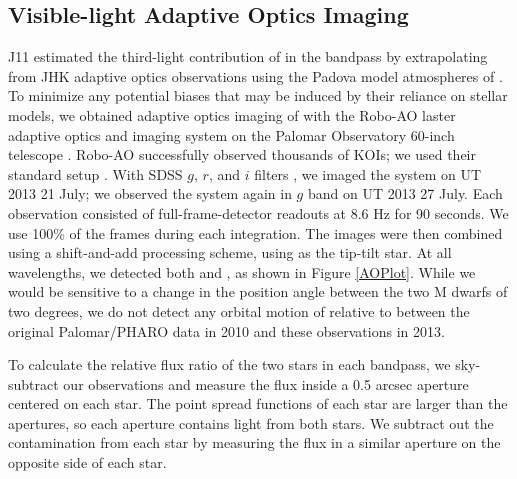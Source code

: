 \subsection{Visible-light Adaptive Optics Imaging}

J11 estimated the third-light contribution of \LB{} in the \itk{} bandpass by extrapolating from JHK adaptive optics observations using the Padova model atmospheres of \citet{Girardi02}. 
To minimize any potential biases that may be induced by their reliance on stellar models, we obtained adaptive optics imaging of \LHS{} with the Robo-AO laster adaptive optics and imaging system on the Palomar Observatory 60-inch telescope \citep{Baranec14}. 
Robo-AO successfully observed thousands of KOIs; we used their standard setup \citep{Law14}. 
With SDSS $g$, $r$, and $i$ filters \citep{York00}, we imaged the system on UT 2013 21 July; we observed the system again in $g$ band on UT 2013 27 July. 
Each observation consisted of full-frame-detector readouts at 8.6 Hz for 90 seconds. 
We use 100\% of the frames during each integration.
The images were then combined using a shift-and-add processing scheme, using \LA{} as the tip-tilt star. 
At all wavelengths, we detected both \LA{} and \LB, as shown in Figure \ref{AOPlot}.
While we would be sensitive to a change in the position angle between the two M dwarfs of two degrees, we do not detect any orbital motion of \LB{} relative to \LA{} between the original Palomar/PHARO data in 2010 and these observations in 2013.


To calculate the relative flux ratio of the two stars in each bandpass, we sky-subtract our observations and measure the flux inside a 0.5 arcsec aperture centered on each star. 
The point spread functions of each star are larger than the apertures, so each aperture contains light from both stars. We subtract out the contamination from each star by measuring the flux in a similar aperture on the opposite side of each star. 


